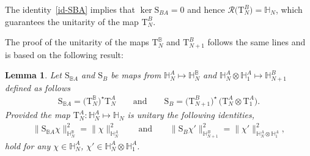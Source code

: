 \documentclass[pdftex]{sigma}%
\numberwithin{equation}{section}
\newtheorem{Lemma}[Theorem]{Lemma}
\begin{document}
The identity~\eqref{id-SBA} implies that $\ker \mathrm S_{BA}=0$ and hence $\mathcal R\big(\mathrm T_N^B\big)=\mathbb H_N$, which guarantees the
unitarity of the map $\mathrm T_N^B$.

The proof of the unitarity of the maps $\mathrm T_N^{\mathbb B}$ and $\mathrm T_{N+1}^B$ follows the same lines and is based on the
following result:

\begin{Lemma}\label{lemma:SBBA}
Let $\mathrm S_{\mathbb B A}$ and $\mathrm S_{B}$ be maps from $\mathbb H_N^A \mapsto \mathbb H^{\mathbb B}_N$ and
$\mathbb H^{A}_N\otimes \mathbb H_{1}^A \mapsto \mathbb H^{B}_{N+1}$ defined as follows
\begin{gather*}
\mathrm S_{\mathbb B A}=\big(\mathrm T_N^{\mathbb B}\big)^{\star} \mathrm T_N^{A}\qquad \text{and}\qquad
\mathrm S_{B}=\big(\mathrm T_{N+1}^{B}\big)^{\star}\,
\big(\mathrm T_{N}^A\otimes \mathrm T_1^A\big).
\end{gather*}
Provided the map $\mathrm T_N^A\colon \mathbb H^{A}_N \mapsto \mathbb H_N$ is unitary the following identities,
\begin{gather*}
\|\mathrm S_{\mathbb B A}\chi\|^2_{\mathbb H_N^{\mathbb B}}=\|\chi\|^2_{\mathbb H_N^A}
\qquad \text{and} \qquad
\|\mathrm S_{B }\chi'\|^2_{\mathbb H_{N+1}^{ B}}=\|\chi'\|^2_{\mathbb H_N^A\otimes \mathbb H_1^A},
\end{gather*}
hold for any $\chi\in\mathbb H_N^A$, $\chi'\in \mathbb H_N^A\otimes \mathbb H_1^A$.
\end{Lemma}
\end{document}
